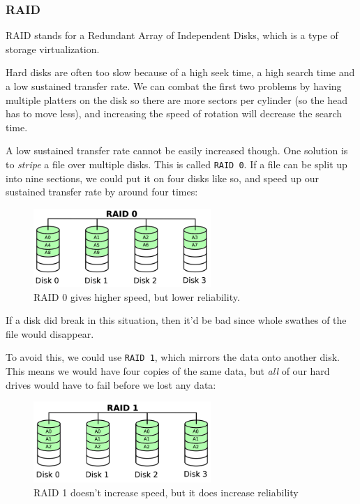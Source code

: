 \subsubsection{RAID}

RAID stands for a Redundant Array of Independent Disks, which is a type of
storage virtualization.

Hard disks are often too slow because of a high seek time, a high search time
and a low sustained transfer rate. We can combat the first two problems by
having multiple platters on the disk so there are more sectors per cylinder (so
the head has to move less), and increasing the speed of rotation will decrease
the search time.

A low sustained transfer rate cannot be easily increased though. One solution is
to \textit{stripe} a file over multiple disks. This is called \texttt{RAID 0}.
If a file can be split up into nine sections, we could put it on four disks like
so, and speed up our sustained transfer rate by around four times:

\begin{figure}[H]
  \centering
  \includegraphics[width=0.6\textwidth]{images/raid0}
  \caption{RAID 0 gives higher speed, but lower reliability.}
  \label{raid0}
\end{figure}  

If a disk did break in this situation, then it'd be bad since whole swathes of
the file would disappear.

To avoid this, we could use \texttt{RAID 1}, which mirrors the data onto
another disk. This means we would have four copies of the same data, but
\textit{all} of our hard drives would have to fail before we lost any data:

\begin{figure}[H]
  \centering
  \includegraphics[width=0.6\textwidth]{images/raid1}
  \caption{RAID 1 doesn't increase speed, but it does increase reliability}
  \label{raid1}
\end{figure}

